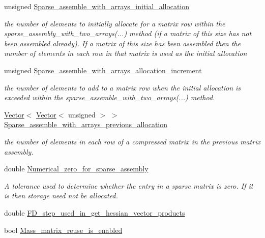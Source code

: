 \begin{DoxyCompactItemize}
unsigned \hyperlink{classoomph_1_1Problem_ad2d5f8e18619fafcff11727b1c55b3eb}{Sparse\+\_\+assemble\+\_\+with\+\_\+arrays\+\_\+initial\+\_\+allocation}
\begin{DoxyCompactList}\small\item\em the number of elements to initially allocate for a matrix row within the sparse\+\_\+assembly\+\_\+with\+\_\+two\+\_\+arrays(...) method (if a matrix of this size has not been assembled already). If a matrix of this size has been assembled then the number of elements in each row in that matrix is used as the initial allocation \end{DoxyCompactList}\item 
unsigned \hyperlink{classoomph_1_1Problem_aeb58a3cead4d10697c4471523f705130}{Sparse\+\_\+assemble\+\_\+with\+\_\+arrays\+\_\+allocation\+\_\+increment}
\begin{DoxyCompactList}\small\item\em the number of elements to add to a matrix row when the initial allocation is exceeded within the sparse\+\_\+assemble\+\_\+with\+\_\+two\+\_\+arrays(...) method. \end{DoxyCompactList}\item 
\hyperlink{classoomph_1_1Vector}{Vector}$<$ \hyperlink{classoomph_1_1Vector}{Vector}$<$ unsigned $>$ $>$ \hyperlink{classoomph_1_1Problem_a547c85bfa6a2eb3effc4db1b46ebcdde}{Sparse\+\_\+assemble\+\_\+with\+\_\+arrays\+\_\+previous\+\_\+allocation}
\begin{DoxyCompactList}\small\item\em the number of elements in each row of a compressed matrix in the previous matrix assembly. \end{DoxyCompactList}\item 
double \hyperlink{classoomph_1_1Problem_ad1a1ffc2bd685377ce7213452876b127}{Numerical\+\_\+zero\+\_\+for\+\_\+sparse\+\_\+assembly}
\begin{DoxyCompactList}\small\item\em A tolerance used to determine whether the entry in a sparse matrix is zero. If it is then storage need not be allocated. \end{DoxyCompactList}\item 
double \hyperlink{classoomph_1_1Problem_ad26c62f5aab816943144ac61fbf7725e}{F\+D\+\_\+step\+\_\+used\+\_\+in\+\_\+get\+\_\+hessian\+\_\+vector\+\_\+products}
\item 
bool \hyperlink{classoomph_1_1Problem_af4d25809ac090102a4d4a398e4ad0e26}{Mass\+\_\+matrix\+\_\+reuse\+\_\+is\+\_\+enabled}

\end{DoxyCompactItemize}
